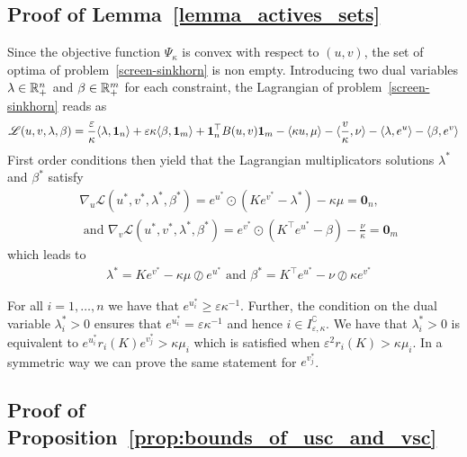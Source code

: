 \subsection{Proof of Lemma~\ref{lemma_actives_sets}}

Since the objective function $\Psi_{\kappa}$ is convex with respect to $(u,v)$, the set of optima of problem~\eqref{screen-sinkhorn} is non empty.
Introducing two dual variables $\lambda \in {\mathbb{R}}^n_{+}$ and $\beta \in {\mathbb{R}}^m_{+}$ for each constraint, the Lagrangian of problem~\eqref{screen-sinkhorn} reads as 
\begin{equation*}
  \mathscr{L}(u,v, \lambda, \beta) = \frac \varepsilon\kappa\langle \lambda, \mathbf{1}_n \rangle + \varepsilon\kappa\langle \beta, \mathbf{1}_m \rangle + \mathbf{1}_n^\top B(u,v) \mathbf{1}_m - \langle \kappa u, \mu \rangle - \langle \frac v\kappa, \nu \rangle -\langle \lambda,e^{u} \rangle - \langle \beta,e^{v} \rangle
\end{equation*}
First order conditions then yield that the Lagrangian multiplicators solutions $\lambda^{*}$ and $\beta^{*}$ satisfy 
\begin{align*}
  &\nabla_u\mathscr{L}(u^{*},v^{*}, \lambda^{*}, \beta^{*})=  e^{u^{*}} \odot(Ke^{v^{*}} - \lambda^{*}) - \kappa\mu = \mathbf 0_n,\\
  & \text{ and } \nabla_v\mathscr{L}(u^{*},v^{*}, \lambda^{*}, \beta^{*})=  e^{v^{*}} \odot(K^\top e^{u^{*}} - \beta) - \frac \nu\kappa = \mathbf 0_m
\end{align*}
which leads to 
\begin{align*}
  &\lambda^{*} = K e^{v^{*}} - \kappa\mu \oslash e^{u^{*}} \text{ and }
  \beta^{*} = K^\top e^{u^{*}} - \nu \oslash \kappa e^{v^{*}}
\end{align*}

For all $i=1, \ldots, n$ we have that $e^{u^{*}_i} \geq \varepsilon\kappa^{-1}$. Further, the condition on the dual variable $\lambda^{*}_i > 0$  ensures that $e^{u^{*}_i} = \varepsilon\kappa^{-1}$ and hence $i \in I^\complement_{\varepsilon,\kappa}$. We have that $\lambda^{*}_i > 0$ is equivalent to $e^{u^{*}_i}r_i(K) e^{v^{*}_j} >  \kappa{\mu_i}$ which  is satisfied when $\varepsilon^2r_i(K) >  \kappa{\mu_i}.$  
In a symmetric way we can prove the same statement for $e^{v^{*}_j}$.

\subsection{Proof of Proposition~\ref{prop:bounds_of_usc_and_vsc}}

